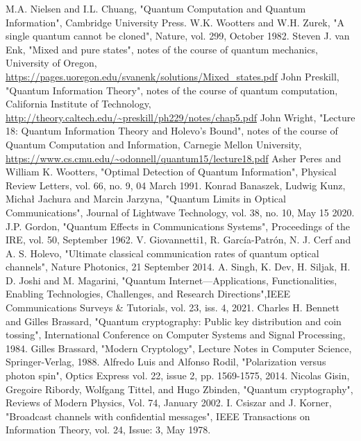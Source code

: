 \documentclass[journal, letterpaper]{IEEEtran}
\begin{document}
\begin{thebibliography}{3}

M.A. Nielsen and I.L. Chuang, "Quantum Computation and Quantum Information", Cambridge University Press.
W.K. Wootters and W.H. Zurek, "A single quantum cannot be cloned", Nature, vol. 299, October 1982.
Steven J. van Enk, "Mixed and pure states", notes of the course of quantum mechanics, University of Oregon, \url{https://pages.uoregon.edu/svanenk/solutions/Mixed_states.pdf}
John Preskill, "Quantum Information Theory", notes of the course of quantum computation, California Institute of Technology, \url{http://theory.caltech.edu/~preskill/ph229/notes/chap5.pdf} 
John Wright, "Lecture 18: Quantum Information Theory and Holevo’s Bound", notes of the course of Quantum Computation and Information, Carnegie Mellon University, \url{https://www.cs.cmu.edu/~odonnell/quantum15/lecture18.pdf}
Asher Peres and William K. Wootters, "Optimal Detection of Quantum Information", Physical Review Letters, vol. 66, no. 9, 04 March 1991.
Konrad Banaszek, Ludwig Kunz, Michał Jachura and Marcin Jarzyna, "Quantum Limits in Optical Communications", Journal of Lightwave Technology, vol. 38, no. 10, May 15 2020.
J.P. Gordon, "Quantum Effects in Communications Systems", Proceedings of the IRE, vol. 50, September 1962.
V. Giovannetti1, R. García-Patrón, N. J. Cerf and A. S. Holevo, "Ultimate classical communication rates of quantum optical channels", Nature Photonics, 21 September 2014.
A. Singh, K. Dev, H. Siljak, H. D. Joshi and M. Magarini,
"Quantum Internet—Applications, Functionalities, Enabling Technologies, Challenges, and Research Directions",IEEE Communications Surveys \& Tutorials, vol. 23, iss. 4, 2021.
Charles H. Bennett and Gilles Brassard, "Quantum cryptography: Public key distribution and coin tossing", International Conference on Computer Systems and Signal Processing, 1984.
Gilles Brassard, "Modern Cryptology", Lecture Notes in Computer Science, Springer-Verlag, 1988.
Alfredo Luis and Alfonso Rodil, "Polarization versus photon spin", Optics Express vol. 22, issue 2, pp. 1569-1575, 2014.
Nicolas Gisin, Gregoire Ribordy, Wolfgang Tittel, and Hugo Zbinden, "Quantum cryptography", Reviews of Modern Physics, Vol. 74, January 2002.
I. Csiszar and J. Korner, "Broadcast channels with confidential messages", IEEE Transactions on Information Theory, vol. 24, Issue: 3, May 1978.

\end{thebibliography}
\end{document}
